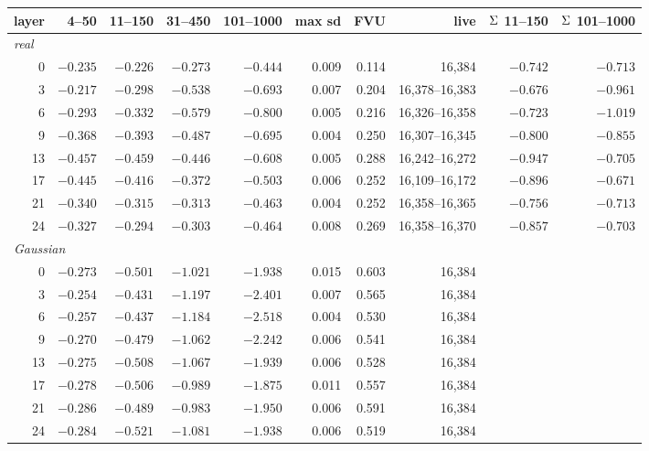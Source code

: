 \begin{tabular}{r rrrr r r r rr}
\toprule
layer & 4--50 & 11--150 & 31--450 & 101--1000 & max sd & FVU & live & $\Sigma$ 11--150 & $\Sigma$ 101--1000 \\
\midrule
\multicolumn{10}{l}{\emph{real}} \\
0 & $-0.235$ & $-0.226$ & $-0.273$ & $-0.444$ & 0.009 & 0.114 & 16,384 & $-0.742$ & $-0.713$ \\
3 & $-0.217$ & $-0.298$ & $-0.538$ & $-0.693$ & 0.007 & 0.204 & 16,378--16,383 & $-0.676$ & $-0.961$ \\
6 & $-0.293$ & $-0.332$ & $-0.579$ & $-0.800$ & 0.005 & 0.216 & 16,326--16,358 & $-0.723$ & $-1.019$ \\
9 & $-0.368$ & $-0.393$ & $-0.487$ & $-0.695$ & 0.004 & 0.250 & 16,307--16,345 & $-0.800$ & $-0.855$ \\
13 & $-0.457$ & $-0.459$ & $-0.446$ & $-0.608$ & 0.005 & 0.288 & 16,242--16,272 & $-0.947$ & $-0.705$ \\
17 & $-0.445$ & $-0.416$ & $-0.372$ & $-0.503$ & 0.006 & 0.252 & 16,109--16,172 & $-0.896$ & $-0.671$ \\
21 & $-0.340$ & $-0.315$ & $-0.313$ & $-0.463$ & 0.004 & 0.252 & 16,358--16,365 & $-0.756$ & $-0.713$ \\
24 & $-0.327$ & $-0.294$ & $-0.303$ & $-0.464$ & 0.008 & 0.269 & 16,358--16,370 & $-0.857$ & $-0.703$ \\
\multicolumn{10}{l}{\emph{Gaussian}} \\
0 & $-0.273$ & $-0.501$ & $-1.021$ & $-1.938$ & 0.015 & 0.603 & 16,384 &  &  \\
3 & $-0.254$ & $-0.431$ & $-1.197$ & $-2.401$ & 0.007 & 0.565 & 16,384 &  &  \\
6 & $-0.257$ & $-0.437$ & $-1.184$ & $-2.518$ & 0.004 & 0.530 & 16,384 &  &  \\
9 & $-0.270$ & $-0.479$ & $-1.062$ & $-2.242$ & 0.006 & 0.541 & 16,384 &  &  \\
13 & $-0.275$ & $-0.508$ & $-1.067$ & $-1.939$ & 0.006 & 0.528 & 16,384 &  &  \\
17 & $-0.278$ & $-0.506$ & $-0.989$ & $-1.875$ & 0.011 & 0.557 & 16,384 &  &  \\
21 & $-0.286$ & $-0.489$ & $-0.983$ & $-1.950$ & 0.006 & 0.591 & 16,384 &  &  \\
24 & $-0.284$ & $-0.521$ & $-1.081$ & $-1.938$ & 0.006 & 0.519 & 16,384 &  &  \\
\bottomrule
\end{tabular}
